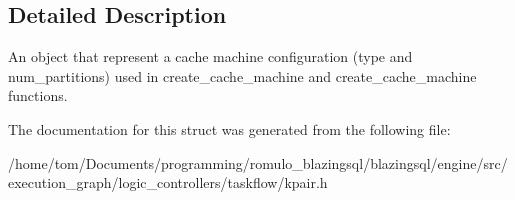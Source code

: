 \subsection{Detailed Description}
An object that represent a cache machine configuration (type and num\+\_\+partitions) used in create\+\_\+cache\+\_\+machine and create\+\_\+cache\+\_\+machine functions. 

The documentation for this struct was generated from the following file\+:\begin{DoxyCompactItemize}
\item 
/home/tom/\+Documents/programming/romulo\+\_\+blazingsql/blazingsql/engine/src/execution\+\_\+graph/logic\+\_\+controllers/taskflow/kpair.\+h\end{DoxyCompactItemize}
